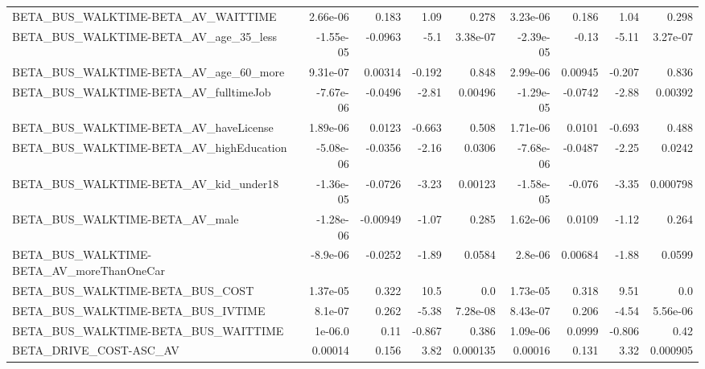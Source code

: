 \begin{tabular}{lrrrrrrrr}
BETA\_BUS\_WALKTIME-BETA\_AV\_WAITTIME                 &    2.66e-06 &        0.183 &     1.09 &    0.278 &   3.23e-06 &       0.186 &         1.04 &         0.298 \\
BETA\_BUS\_WALKTIME-BETA\_AV\_age\_35\_less              &   -1.55e-05 &      -0.0963 &     -5.1 & 3.38e-07 &  -2.39e-05 &       -0.13 &        -5.11 &      3.27e-07 \\
BETA\_BUS\_WALKTIME-BETA\_AV\_age\_60\_more              &    9.31e-07 &      0.00314 &   -0.192 &    0.848 &   2.99e-06 &     0.00945 &       -0.207 &         0.836 \\
BETA\_BUS\_WALKTIME-BETA\_AV\_fulltimeJob              &   -7.67e-06 &      -0.0496 &    -2.81 &  0.00496 &  -1.29e-05 &     -0.0742 &        -2.88 &       0.00392 \\
BETA\_BUS\_WALKTIME-BETA\_AV\_haveLicense              &    1.89e-06 &       0.0123 &   -0.663 &    0.508 &   1.71e-06 &      0.0101 &       -0.693 &         0.488 \\
BETA\_BUS\_WALKTIME-BETA\_AV\_highEducation            &   -5.08e-06 &      -0.0356 &    -2.16 &   0.0306 &  -7.68e-06 &     -0.0487 &        -2.25 &        0.0242 \\
BETA\_BUS\_WALKTIME-BETA\_AV\_kid\_under18              &   -1.36e-05 &      -0.0726 &    -3.23 &  0.00123 &  -1.58e-05 &      -0.076 &        -3.35 &      0.000798 \\
BETA\_BUS\_WALKTIME-BETA\_AV\_male                     &   -1.28e-06 &     -0.00949 &    -1.07 &    0.285 &   1.62e-06 &      0.0109 &        -1.12 &         0.264 \\
BETA\_BUS\_WALKTIME-BETA\_AV\_moreThanOneCar           &    -8.9e-06 &      -0.0252 &    -1.89 &   0.0584 &    2.8e-06 &     0.00684 &        -1.88 &        0.0599 \\
BETA\_BUS\_WALKTIME-BETA\_BUS\_COST                    &    1.37e-05 &        0.322 &     10.5 &      0.0 &   1.73e-05 &       0.318 &         9.51 &           0.0 \\
BETA\_BUS\_WALKTIME-BETA\_BUS\_IVTIME                  &     8.1e-07 &        0.262 &    -5.38 & 7.28e-08 &   8.43e-07 &       0.206 &        -4.54 &      5.56e-06 \\
BETA\_BUS\_WALKTIME-BETA\_BUS\_WAITTIME                &     1e-06.0 &         0.11 &   -0.867 &    0.386 &   1.09e-06 &      0.0999 &       -0.806 &          0.42 \\
BETA\_DRIVE\_COST-ASC\_AV                             &     0.00014 &        0.156 &     3.82 & 0.000135 &    0.00016 &       0.131 &         3.32 &      0.000905 \\

\end{tabular}

